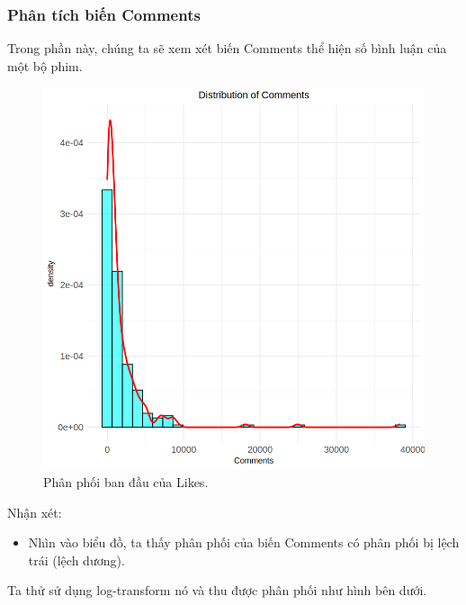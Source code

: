 \subsubsection{Phân tích biến Comments}

Trong phần này, chúng ta sẽ xem xét biến Comments thể hiện số bình luận của một bộ phim.

\begin{figure}[H]
    \centering
    \includegraphics[width=0.75\columnwidth]{csm_figures/comments_original_distribution.png}
    \caption{Phân phối ban đầu của Likes.}
    \label{fig:comments_original_distribution}
\end{figure}

Nhận xét:
\begin{itemize}
    \item Nhìn vào biểu đồ, ta thấy phân phối của biến Comments có phân phối bị lệch trái (lệch dương).
\end{itemize}

Ta thử sử dụng log-transform nó và thu được phân phối như hình bên dưới.

